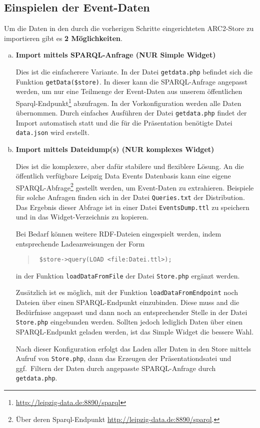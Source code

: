 \documentclass[11pt,a4paper]{article}
\begin{document}
\subsection{Einspielen der Event-Daten}
Um die Daten in den durch die vorherigen Schritte eingerichteten ARC2-Store zu
importieren gibt es \textbf{2 Möglichkeiten}.
\begin{enumerate}[a)]
\item \textbf{Import mittels SPARQL-Anfrage (NUR Simple Widget)}

  Dies ist die einfacherere Variante. In der Datei \texttt{getdata.php}
  befindet sich die Funktion \texttt{getData(\$store)}.  In dieser kann die
  SPARQL-Anfrage angepasst werden, um nur eine Teilmenge der Event-Daten aus
  unserem öffentlichen
  Sparql-Endpunkt\footnote{\url{http://leipzig-data.de:8890/sparql}}
  abzufragen. In der Vorkonfiguration werden alle Daten übernommen. Durch
  einfaches Ausführen der Datei \texttt{getdata.php} findet der Import
  automatisch statt und die für die Präsentation benötigte Datei
  \texttt{data.json} wird erstellt.

\item \textbf{Import mittels Dateidump(s) (NUR komplexes Widget)}

Dies ist die komplexere, aber dafür stabilere und flexiblere Lösung.  An die
öffentlich verfügbare Leipzig Data Events Datenbasis kann eine eigene
SPARQL-Abfrage\footnote{Über deren Sparql-Endpunkt
  \url{http://leipzig-data.de:8890/sparql}.} gestellt werden, um Event-Daten
zu extrahieren.  Beispiele für solche Anfragen finden sich in der Datei
\texttt{Queries.txt} der Distribution.  Das Ergebnis dieser Abfrage ist in
einer Datei \texttt{EventsDump.ttl} zu speichern und in das Widget-Verzeichnis
zu kopieren.

Bei Bedarf können weitere RDF-Dateien eingespielt werden, indem entsprechende
Ladeanweisungen der Form
\begin{quote}\tt
  \$store->query({\dq}LOAD <file:Datei.ttl>{\dq});
\end{quote}
in der Funktion \texttt{loadDataFromFile} der Datei \texttt{Store.php} ergänzt
werden.

Zusätzlich ist es möglich, mit der Funktion \texttt{loadDataFromEndpoint} noch
Dateien über einen SPARQL-Endpunkt einzubinden. Diese muss and die Bedürfnisse
angepasst und dann noch an entsprechender Stelle in der Datei
\texttt{Store.php} eingebunden werden. Sollten jedoch lediglich Daten über
einen SPARQL-Endpunkt geladen werden, ist das Simple Widget die bessere Wahl.

Nach dieser Konfiguration erfolgt das Laden aller Daten in den Store mittels
Aufruf von \texttt{Store.php}, dann das Erzeugen der Präsentationdsatei und
ggf.\ Filtern der Daten durch angepasste SPARQL-Anfrage durch
\texttt{getdata.php}.
\end{enumerate}
\end{document}
